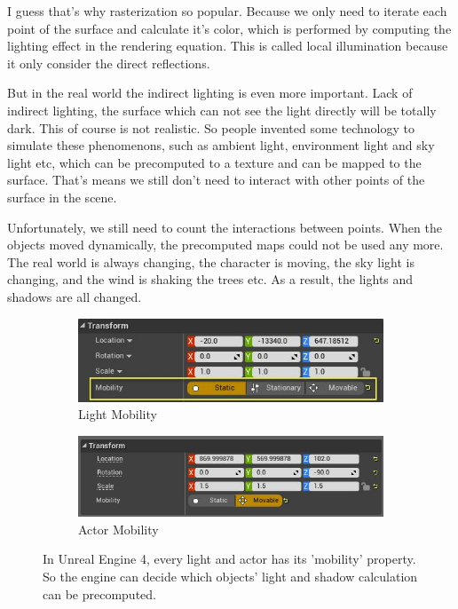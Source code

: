 I guess that's why rasterization so popular. Because we only need to iterate each point of the surface and calculate it's color, which is performed by computing the lighting effect in the rendering equation. This is called local illumination because it only consider the direct reflections. 

But in the real world the indirect lighting is even more important. Lack of indirect lighting, the surface which can not see the light directly will be totally dark. This of course is not realistic. So people invented some technology to simulate these phenomenons, such as ambient light, environment light and sky light etc, which can be precomputed to a texture and can be mapped to the surface. That's means we still don't need to interact with other points of the surface in the scene.   

Unfortunately, we still need to count the interactions between points. When the objects moved dynamically, the precomputed maps could not be used any more. The real world is always changing, the character is moving, the sky light is changing, and the wind is shaking the trees etc. As a result, the lights and shadows are all changed.

\begin{figure}\label{f:object-mobility}
	\begin{subfigure}[b]{0.49\textwidth}
		\includegraphics{graphics/df/IL_mobility}
		\caption{Light Mobility}
	\end{subfigure}
	\begin{subfigure}[b]{0.51\textwidth}
		\includegraphics{graphics/df/TransformMobility}
		\caption{Actor Mobility}
	\end{subfigure}
	\caption{In Unreal Engine 4, every light and actor has its 'mobility' property. So the engine can decide which objects' light and shadow calculation can be precomputed.}
\end{figure}

